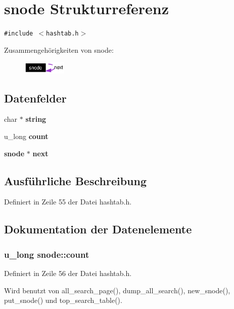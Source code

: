 \section{snode Strukturreferenz}
\label{structsnode}
{\tt \#include $<$hashtab.h$>$}

Zusammengeh\"{o}rigkeiten von snode:\begin{figure}[H]
\begin{center}
\leavevmode
\includegraphics[width=59pt]{structsnode__coll__graph}
\end{center}
\end{figure}
\subsection*{Datenfelder}
\begin{CompactItemize}
\item 
char $\ast$ {\bf string}
\item 
u\_\-long {\bf count}
\item 
{\bf snode} $\ast$ {\bf next}
\end{CompactItemize}


\subsection{Ausf\"{u}hrliche Beschreibung}




Definiert in Zeile 55 der Datei hashtab.h.

\subsection{Dokumentation der Datenelemente}
\subsubsection{\setlength{\rightskip}{0pt plus 5cm}u\_\-long {\bf snode::count}}\label{structsnode_af14980bcdb9d5e9543507adee3fd803}




Definiert in Zeile 56 der Datei hashtab.h.

Wird benutzt von all\_\-search\_\-page(), dump\_\-all\_\-search(), new\_\-snode(), put\_\-snode() und top\_\-search\_\-table().
